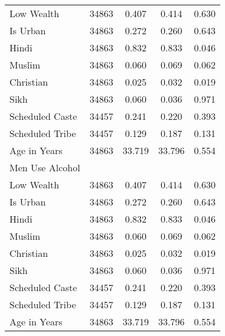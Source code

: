 \begin{tabular}{l*{4}{c}}
Low Wealth  &       34863&       0.407&       0.414&       0.630\\
Is Urban    &       34863&       0.272&       0.260&       0.643\\
Hindi       &       34863&       0.832&       0.833&       0.046\\
Muslim      &       34863&       0.060&       0.069&       0.062\\
Christian   &       34863&       0.025&       0.032&       0.019\\
Sikh        &       34863&       0.060&       0.036&       0.971\\
Scheduled Caste&       34457&       0.241&       0.220&       0.393\\
Scheduled Tribe&       34457&       0.129&       0.187&       0.131\\
Age in Years&       34863&      33.719&      33.796&       0.554\\
\hline
Men Use Alcohol&            &            &            &            \\
Low Wealth  &       34863&       0.407&       0.414&       0.630\\
Is Urban    &       34863&       0.272&       0.260&       0.643\\
Hindi       &       34863&       0.832&       0.833&       0.046\\
Muslim      &       34863&       0.060&       0.069&       0.062\\
Christian   &       34863&       0.025&       0.032&       0.019\\
Sikh        &       34863&       0.060&       0.036&       0.971\\
Scheduled Caste&       34457&       0.241&       0.220&       0.393\\
Scheduled Tribe&       34457&       0.129&       0.187&       0.131\\
Age in Years&       34863&      33.719&      33.796&       0.554\\
\hline\hline
\end{tabular}
